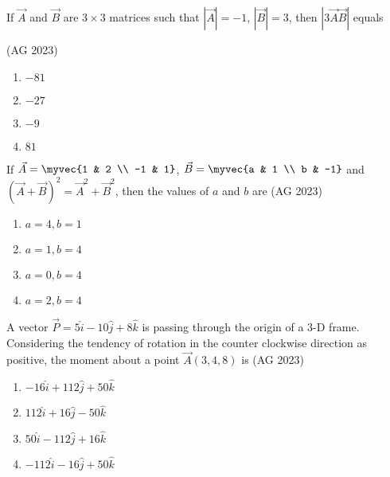 \item If $\vec{A}$ and $\vec{B}$ are $3\times 3$ matrices such that $|\vec{A}|=-1$, $|\vec{B}|=3$, then $|3\vec{A}\vec{B}|$ equals

\hfill{(AG 2023)}
\begin{multicols}{4}
\begin{enumerate}
    \item $-81$
    \item $-27$
    \item $-9$
    \item $81$
\end{enumerate}
\end{multicols}
    \item If $\vec{A} = \myvec{1 & 2 \\ -1 & 1}$, $\vec{B} = \myvec{a & 1 \\ b & -1}$ and $(\vec{A}+\vec{B})^{2} = \vec{A}^{2} + \vec{B}^{2}$, then the values of $a$ and $b$ are
\hfill{(AG 2023)}
    \begin{multicols}{4}
    \begin{enumerate}
        \item $a = 4, b = 1$
        \item $a = 1, b = 4$
        \item $a = 0, b = 4$
        \item $a = 2, b = 4$
    \end{enumerate}
    \end{multicols}
    \item A vector $\vec{P} = 5\hat{i} - 10\hat{j} + 8\hat{k}$ is passing through the origin of a 3-D frame. Considering the tendency of rotation in the counter clockwise direction as positive, the moment about a point $\vec{A} (3, 4, 8)$ is
\hfill{(AG 2023)}
    \begin{multicols}{2}
    \begin{enumerate}
        \item $-16\hat{i} + 112\hat{j} + 50\hat{k}$
        \item $112\hat{i} + 16\hat{j} - 50\hat{k}$
        \item $50\hat{i} - 112\hat{j} + 16\hat{k}$
        \item $-112\hat{i} - 16\hat{j} + 50\hat{k}$
    \end{enumerate}
    \end{multicols}
